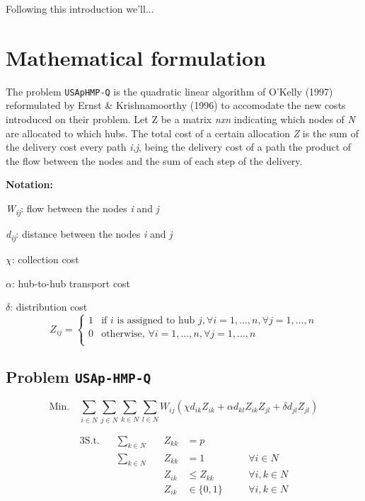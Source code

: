 \documentclass[onecolumn]{IEEEtran}
\newcommand{\wij}{\emph{W\textsubscript{ij}}}
\def\code#1{\texttt{#1}}
\def\point#1#2{\emph{#1\textsubscript{#2}}}
\begin{document}
Following this introduction we'll... 


\section{Mathematical formulation}

The problem \code{USApHMP-Q} is the quadratic linear algorithm of O'Kelly (1997)\cite{OKelly1987}
reformulated by Ernst \& Krishnamoorthy (1996)\cite{Ernst1996} to accomodate the new costs
introduced on their problem. Let Z be a matrix \emph{nxn} indicating which nodes of \emph{N} are
allocated to which hubs. The total cost of a certain allocation \emph{Z} is the sum of the
delivery cost every path \emph{i,j}, being the delivery cost of a path the product of the
flow between the nodes and the sum of each step of the delivery.

\break

\textbf{Notation:}

\wij: flow between the nodes \emph{i} and \emph{j}

\point{d}{ij}: distance between the nodes \emph{i} and \emph{j} 

$\chi$: collection cost

$\alpha$: hub-to-hub transport cost

$\delta$: distribution cost
\[
Z_{ij} = \begin{cases}
  1 & \text{if } i \text{ is assigned to hub } j, \forall i = 1,\dots,n, \forall j = 1,\dots,n \\
  0 & \text{otherwise, }\forall i = 1,\dots,n, \forall j = 1,\dots,n \\
\end{cases}
\]

\subsection{Problem \code{USAp-HMP-Q}}

\[
  \text{Min.} \quad \sum_{i\in N}\sum_{j\in N}\sum_{k\in N}\sum_{l\in N} W_{ij}(\chi d_{ik} Z_{ik} + \alpha d_{kl} Z_{ik} Z_{jl} + \delta d_{jl} Z_{jl})
\]

\begin{alignat}{3}
  \text{S.t.} \quad & \sum_{k \in N} & \quad Z_{kk} &= p         & \label{p_hubs}\\
                    & \sum_{k \in N} & \quad Z_{kk} &= 1         & \quad & \forall i \in N \label{single_alloc} \\
                    &                & \quad Z_{ik} &\le Z_{kk}  & \quad & \forall i, k \in N \label{only_hubs} \\
                    &                & \quad Z_{ik} &\in \{0,1\} & \quad & \forall i, k \in N \label{prev_realloc}
\end{alignat}
\end{document}
